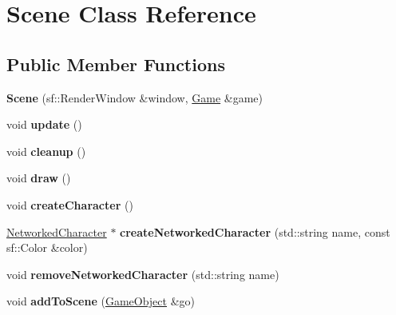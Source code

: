 \hypertarget{class_scene}{\section{Scene Class Reference}
\label{class_scene}
}
\subsection*{Public Member Functions}
\begin{DoxyCompactItemize}
\item 
\hypertarget{class_scene_a80794b261fa465fb93ce273a0ce2caca}{{\bfseries Scene} (sf\-::\-Render\-Window \&window, \hyperlink{class_game}{Game} \&game)}\label{class_scene_a80794b261fa465fb93ce273a0ce2caca}

\item 
\hypertarget{class_scene_aa24c7e636c10e4e42650c1374b90bb80}{void {\bfseries update} ()}\label{class_scene_aa24c7e636c10e4e42650c1374b90bb80}

\item 
\hypertarget{class_scene_a6c04883087016b9448e5599d2e34422c}{void {\bfseries cleanup} ()}\label{class_scene_a6c04883087016b9448e5599d2e34422c}

\item 
\hypertarget{class_scene_ac0e3d2c98ba6063a086467fb2c19142f}{void {\bfseries draw} ()}\label{class_scene_ac0e3d2c98ba6063a086467fb2c19142f}

\item 
\hypertarget{class_scene_a1b7c88ec2c1a88943d5b79b37f5abe49}{void {\bfseries create\-Character} ()}\label{class_scene_a1b7c88ec2c1a88943d5b79b37f5abe49}

\item 
\hypertarget{class_scene_ade38b7ea256a5531b31305303e9a655a}{\hyperlink{class_networked_character}{Networked\-Character} $\ast$ {\bfseries create\-Networked\-Character} (std\-::string name, const sf\-::\-Color \&color)}\label{class_scene_ade38b7ea256a5531b31305303e9a655a}

\item 
\hypertarget{class_scene_aae77284da4e2622e7a47bf3fe29a2662}{void {\bfseries remove\-Networked\-Character} (std\-::string name)}\label{class_scene_aae77284da4e2622e7a47bf3fe29a2662}

\item 
\hypertarget{class_scene_a85ec2e74504cc6e7f6ad42832652b976}{void {\bfseries add\-To\-Scene} (\hyperlink{class_game_object}{Game\-Object} \&go)}\label{class_scene_a85ec2e74504cc6e7f6ad42832652b976}


\end{DoxyCompactItemize}
